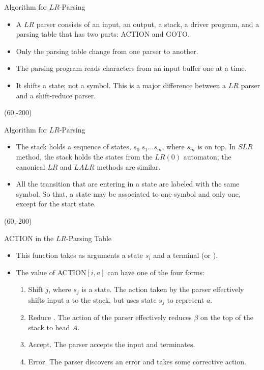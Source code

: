 \begin{bibunit}[apalike]
\begin{frame}[t]{Algorithm for $LR$-Parsing }
	\begin{itemize}
	\item A $LR$ parser consists of an input, an output, a stack, a driver program, and a parsing table that has two parts: ACTION and GOTO.
	\item Only the parsing table change from one parser to another.
	\item The parsing program reads characters from an input buffer one at a time.
	\item It shifts a state; not a symbol. This is a major difference between a $LR$ parser and a shift-reduce parser.
	\end{itemize}
	\putat(60,-200){}
\end{frame}

\begin{frame}[t]{Algorithm for $LR$-Parsing }
	\begin{small}
	\begin{itemize}
	\item The stack holds a sequence of states, $s_0\;s_1 \dots s_m$, where $s_m$ is on top. In $SLR$ method, the stack holds the states from the $LR(0)$ automaton; the canonical $LR$ and $LALR$ methods are similar.
	\item All the transition that are entering in a state are labeled with the same symbol. So that, a state may be associated to one symbol and only one, except for the start state.
	\end{itemize}
	\end{small}
	\putat(60,-200){}
\end{frame}

\begin{frame}{ACTION in the $LR$-Parsing Table}
	\begin{itemize}
	\item This function takes as arguments a state $s_i$ and a terminal  (or ).
	\vfill
	\item The value of ACTION$[i,a]$ can have one of the four forms:
		\begin{enumerate}
		\item Shift $j$, where $s_j$ is a state. The action taken by the parser effectively shifts input a to the stack, but uses state $s_j$ to represent $a$.
		\item Reduce . The action of the parser effectively reduces $\beta$ on the top of the stack to head $A$.
		\item Accept. The parser accepts the input and terminates.
		\item Error. The parser discovers an error and takes some corrective action.
		\end{enumerate}
	\end{itemize}
\end{frame}


\end{bibunit}
